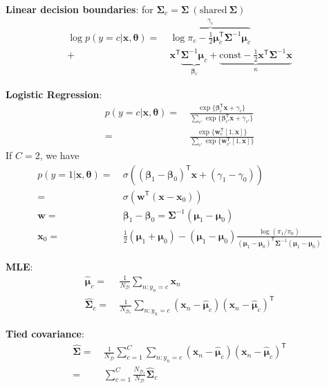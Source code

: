 \textbf{Linear decision boundaries}: 
for $\bm{\Sigma}_c=\bm{\Sigma}~(\text{shared}~\bm{\Sigma})$
\begin{align}
    \log{p(y=c|\bm{x},\bm{\theta})}
    =&~ \overbrace{
        \log{\pi_c} - \frac{1}{2}\bm{\mu}_c^\mathsf{T}\bm{\Sigma}^{-1}\bm{\mu}_c
    }^{\gamma_c} \\
    +&~ \boxed{
        \bm{x}^\mathsf{T}\underbrace{\bm{\Sigma}^{-1}\bm{\mu}_c}_{\bm{\beta}_c}
    }
    + \underbrace{
        \text{const} - \frac{1}{2}\bm{x}^\mathsf{T}\bm{\Sigma}^{-1}\bm{x}
    }_{\kappa}
\end{align}

\textbf{Logistic Regression}:
\begin{align}
    p(y=c|\bm{x},\bm{\theta})
    =&~ \frac{\exp\{\bm{\beta}_c^\mathsf{T}\bm{x}+\gamma_c\}}{\sum_{c'}\exp\{\bm{\beta}_{c'}^\mathsf{T}\bm{x}+\gamma_{c'}\}} \\
    =&~ \frac{\exp\{\bm{w}_c^\mathsf{T}[1,\bm{x}]\}}{\sum_{c'}\exp\{\bm{w}_{c'}^\mathsf{T}[1,\bm{x}]\}}
\end{align}
If $C=2$, we have 
\begin{align}
    p(y=1|\bm{x},\bm{\theta}) 
    =&~ \sigma\left((\bm{\beta}_1-\bm{\beta}_0)^\mathsf{T}\bm{x}+(\gamma_1-\gamma_0)\right)\\
    =&~ \sigma(\bm{w}^\mathsf{T}(\bm{x}-\bm{x}_0))\\
    \bm{w} =&~ \bm{\beta}_1-\bm{\beta}_0 = \bm{\Sigma}^{-1}(\bm{\mu}_1-\bm{\mu}_0) \\
    \bm{x}_0 =&~ \frac{1}{2}(\bm{\mu}_1 + \bm{\mu}_0) 
        - (\bm{\mu}_1 - \bm{\mu}_0)
        \frac{\log(\pi_1/\pi_0)}
        {(\bm{\mu}_1 - \bm{\mu}_0)^\mathsf{T}\bm{\Sigma}^{-1}(\bm{\mu}_1 - \bm{\mu}_0)}
\end{align}


\textbf{MLE}:
\begin{align}
    \hat{\bm{\mu}}_c =&~ \frac{1}{N_{\mathcal{D}}}\sum_{n:y_n=c}\bm{x}_n \\
    \hat{\bm{\Sigma}}_c =&~ \frac{1}{N_{\mathcal{D}_c}}\sum_{n:y_n=c}
    \left(\bm{x}_n-\hat{\bm{\mu}}_c\right)\left(\bm{x}_n-\hat{\bm{\mu}}_c\right)^\mathsf{T}
\end{align}

\textbf{Tied covariance}:
\begin{align}
    \hat{\bm{\Sigma}}
    =&~ \frac{1}{N_{\mathcal{D}}}\sum_{c=1}^C\sum_{n:y_n=c}
    \left(\bm{x}_n-\hat{\bm{\mu}}_c\right)\left(\bm{x}_n-\hat{\bm{\mu}}_c\right)^\mathsf{T} \\
    =&~ \sum_{c=1}^C\frac{N_{\mathcal{D}_c}}{N_{\mathcal{D}}}\hat{\bm{\Sigma}}_c
\end{align}


